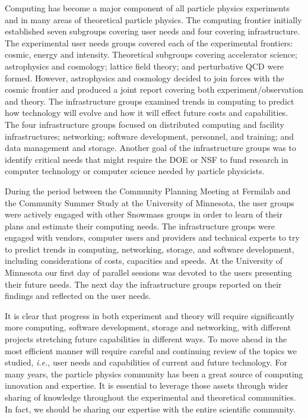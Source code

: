 Computing has become a major component of all particle physics
experiments and in many areas of theoretical particle physics.
The computing frontier initially established seven subgroups
covering user needs and four covering infrastructure.  
The experimental user needs groups
covered each of the experimental frontiers: cosmic, energy and intensity.
Theoretical subgroups covering accelerator science; astrophysics and
cosmology; lattice field theory; and perturbative QCD were formed.  However,
astrophysics and cosmology decided to join forces with the cosmic frontier and produced
a joint report covering both experiment/observation and theory.
The infrastructure groups examined trends in computing
to predict how technology will evolve and how it will effect future
costs and capabilities.
The four infrastructure groups focused on distributed computing 
and facility infrastructures; networking;
software development, personnel,  and training; and
data management and storage.
Another goal of the infrastructure groups was to identify
critical needs that might require the DOE or NSF to fund
research in computer technology or computer science needed by
particle physicists.

During the period between the Community Planning Meeting at
Fermilab and the Community Summer Study at the University of
Minnesota, the user groups were actively engaged with other
Snowmass groups in order to learn of their plans and estimate their
computing needs.  The infrastructure groups were engaged with
vendors, computer users and providers and technical experts to
try to predict trends in computing, networking, storage, and software
development, including considerations of
costs, capacities and speeds.  At the University of Minnesota our
first day of parallel sessions was devoted to the users presenting
their future needs.  The next day the infrastructure groups
reported on their findings and reflected on the user needs.

It is clear that progress in both experiment and theory will require
significantly more computing, software development, storage and networking, 
with different projects stretching future capabilities in different ways.
To move ahead in the most efficient manner will require careful and
continuing review of the topics we studied, {\it i.e.}, user needs and
capabilities of current and future technology.  
For many years, the particle physics community has been a great source 
of computing innovation and expertise.  It is essential to leverage those
assets through wider sharing of knowledge throughout the experimental
and theoretical communities.  In fact, we should be sharing our
expertise with the entire scientific community.

